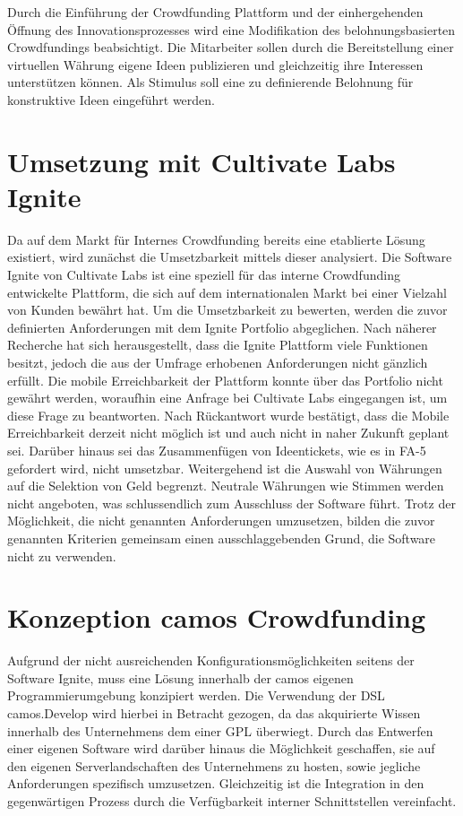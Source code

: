 Durch die Einführung der Crowdfunding Plattform und der einhergehenden Öffnung des Innovationsprozesses wird eine Modifikation des belohnungsbasierten Crowdfundings beabsichtigt. Die Mitarbeiter sollen durch die Bereitstellung einer virtuellen Währung eigene Ideen publizieren und gleichzeitig ihre Interessen unterstützen können. Als Stimulus soll eine zu definierende Belohnung für konstruktive Ideen eingeführt werden.

\section{Umsetzung mit Cultivate Labs Ignite}\label{sec:ignite}
Da auf dem Markt für Internes Crowdfunding bereits eine etablierte Lösung existiert, wird zunächst die Umsetzbarkeit mittels dieser analysiert. Die Software Ignite von Cultivate Labs ist eine speziell für das interne Crowdfunding entwickelte Plattform, die sich auf dem internationalen Markt bei einer Vielzahl von Kunden bewährt hat. Um die Umsetzbarkeit zu bewerten, werden die zuvor definierten Anforderungen mit dem Ignite Portfolio abgeglichen. Nach näherer Recherche hat sich herausgestellt, dass die Ignite Plattform viele Funktionen besitzt, jedoch die aus der Umfrage erhobenen Anforderungen nicht gänzlich erfüllt. Die mobile Erreichbarkeit der Plattform konnte über das Portfolio nicht gewährt werden, woraufhin eine Anfrage bei Cultivate Labs eingegangen ist, um diese Frage zu beantworten. Nach Rückantwort wurde bestätigt, dass die Mobile Erreichbarkeit derzeit nicht möglich ist und auch nicht in naher Zukunft geplant sei. Darüber hinaus sei das Zusammenfügen von Ideentickets, wie es in \ac{FA}-5 gefordert wird, nicht umsetzbar. Weitergehend ist die Auswahl von Währungen auf die Selektion von Geld begrenzt. Neutrale Währungen wie Stimmen werden nicht angeboten, was schlussendlich zum Ausschluss der Software führt. Trotz der Möglichkeit, die nicht genannten Anforderungen umzusetzen, bilden die zuvor genannten Kriterien gemeinsam einen ausschlaggebenden Grund, die Software nicht zu verwenden.

\newpage

\section{Konzeption camos Crowdfunding}\label{sec:c_crowd}
Aufgrund der nicht ausreichenden Konfigurationsmöglichkeiten seitens der Software Ignite, muss eine Lösung innerhalb der camos eigenen Programmierumgebung konzipiert werden. Die Verwendung der \ac{DSL} camos.Develop wird hierbei in Betracht gezogen, da das akquirierte Wissen innerhalb des Unternehmens dem einer \ac{GPL} überwiegt. Durch das Entwerfen einer eigenen Software wird darüber hinaus die Möglichkeit geschaffen, sie auf den eigenen Serverlandschaften des Unternehmens zu hosten, sowie jegliche Anforderungen spezifisch umzusetzen. Gleichzeitig ist die Integration in den gegenwärtigen Prozess durch die Verfügbarkeit interner Schnittstellen vereinfacht. 

